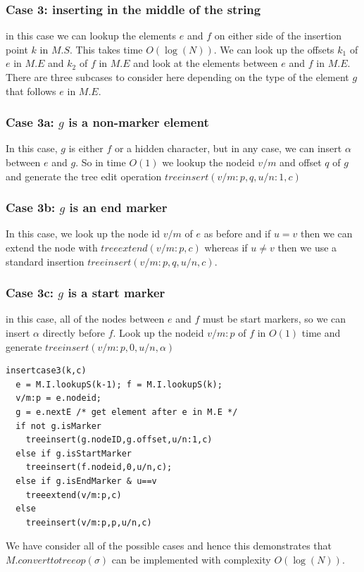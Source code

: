 \documentclass{amsart}
\begin{document}
\subsubsection{Case 3: inserting in the middle of the string}
in this case we can lookup the elements $e$ and $f$ on either side of the insertion point $k$ in $M.S$. This takes time $O(\log(N))$.  We can look up the offsets $k_1$ of $e$ in $M.E$ and $k_2$ of $f$ in $M.E$ and look at the elements between $e$ and $f$ in $M.E$. There are three subcases to consider here depending on the type of the element $g$ that follows $e$ in $M.E$.

\subsubsection{Case 3a: $g$ is a non-marker element}
In this case, $g$ is either $f$ or a hidden character, but in any case, we can insert $\alpha$ between $e$ and $g$. So in time $O(1)$ we lookup the nodeid $v/m$ and
offset $q$ of $g$ and generate the tree edit operation 
$treeinsert(v/m:p,q,u/n:1,c)$

\subsubsection{Case 3b: $g$ is an end marker}
In this case, we look up the node id $v/m$ of $e$ as before and if $u=v$
then we can extend the node with $treeextend(v/m:p,c)$ whereas if $u\ne v$
then we use a standard insertion $treeinsert(v/m:p,q,u/n,c)$.


\subsubsection{Case 3c: $g$ is a start marker}
in this case, all of the nodes between $e$ and $f$ must be start markers,
so we can insert $\alpha$ directly before $f$.  Look up the nodeid $v/m:p$ of $f$
in $O(1)$ time and generate $treeinsert(v/m:p,0,u/n,\alpha)$

\begin{verbatim}
insertcase3(k,c)
  e = M.I.lookupS(k-1); f = M.I.lookupS(k);
  v/m:p = e.nodeid; 
  g = e.nextE /* get element after e in M.E */
  if not g.isMarker
    treeinsert(g.nodeID,g.offset,u/n:1,c)
  else if g.isStartMarker
    treeinsert(f.nodeid,0,u/n,c);
  else if g.isEndMarker & u==v
    treeextend(v/m:p,c)
  else
    treeinsert(v/m:p,p,u/n,c)
\end{verbatim}
We have consider all of the possible cases and hence this demonstrates that 
$M.converttotreeop(\sigma)$ can be implemented with complexity $O(\log(N))$.
\end{document}

